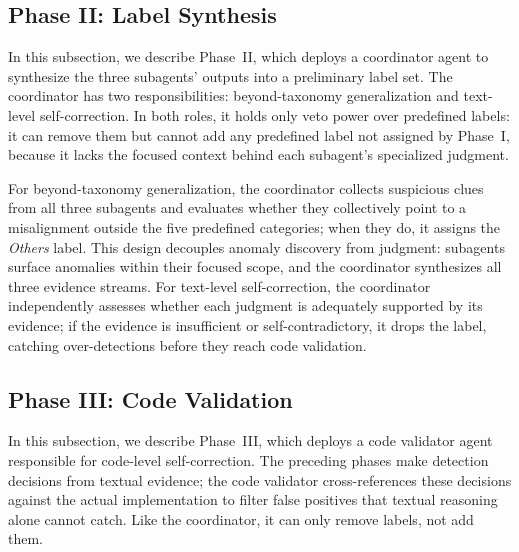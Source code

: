 \documentclass[sigconf, review, anonymous]{acmart}
\begin{document}
    \subsection{Phase II: Label Synthesis}
    \label{sec:coordinator}

    In this subsection, we describe Phase~II, which deploys a coordinator agent to synthesize the three subagents' outputs into a preliminary label set. The coordinator has two responsibilities: beyond-taxonomy generalization and text-level self-correction. In both roles, it holds only veto power
  over predefined labels: it can remove them but cannot add any
  predefined label not assigned by Phase~I, because it lacks the
  focused context behind each subagent's specialized judgment.

  For beyond-taxonomy generalization, the coordinator collects
  suspicious clues from all three subagents and evaluates whether they
  collectively point to a misalignment outside the five predefined
  categories; when they do, it assigns the \textit{Others} label.
  This design decouples anomaly discovery from judgment: subagents
  surface anomalies within their focused scope, and the coordinator
  synthesizes all three evidence streams. For text-level
  self-correction, the coordinator independently assesses whether each
  judgment is adequately supported by its evidence; if the evidence is
  insufficient or self-contradictory, it drops the label, catching
  over-detections before they reach code validation.

    \subsection{Phase III: Code Validation}
    \label{sec:code_validator}

    In this subsection, we describe Phase~III, which deploys a code validator agent responsible for code-level self-correction. The preceding phases make detection decisions from textual evidence;
  the code validator cross-references these decisions against the                                                                          
  actual implementation to filter false positives that textual
  reasoning alone cannot catch. Like the coordinator, it can only                                                                          
  remove labels, not add them.                                                                                                             
                                                                                                                                           
\end{document}
